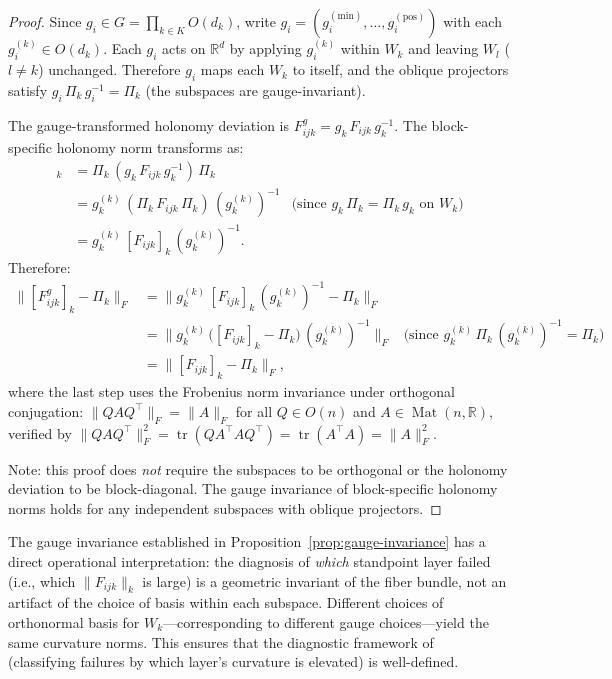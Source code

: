 \begin{proof}
Since $g_i \in G = \prod_{k \in K} O(d_k)$, write $g_i = (g_i^{(\mathrm{min})}, \ldots,
g_i^{(\mathrm{pos})})$ with each $g_i^{(k)} \in O(d_k)$. Each $g_i$ acts on $\mathbb{R}^d$
by applying $g_i^{(k)}$ within $W_k$ and leaving $W_l$ ($l \neq k$) unchanged. Therefore
$g_i$ maps each $W_k$ to itself, and the oblique projectors satisfy $g_i\, \Pi_k\,
g_i^{-1} = \Pi_k$ (the subspaces are gauge-invariant).

The gauge-transformed holonomy deviation is $F^g_{ijk} = g_k\, F_{ijk}\, g_k^{-1}$. The
block-specific holonomy norm transforms as:
\begin{align*}
    [F^g_{ijk}]_k
    &= \Pi_k\, (g_k\, F_{ijk}\, g_k^{-1})\, \Pi_k \\
    &= g_k^{(k)}\, (\Pi_k\, F_{ijk}\, \Pi_k)\, (g_k^{(k)})^{-1}
       & \text{(since } g_k\, \Pi_k = \Pi_k\, g_k \text{ on } W_k\text{)} \\
    &= g_k^{(k)}\, [F_{ijk}]_k\, (g_k^{(k)})^{-1}.
\end{align*}
Therefore:
\begin{align*}
    \big\|[F^g_{ijk}]_k - \Pi_k\big\|_F
    &= \big\|g_k^{(k)}\, [F_{ijk}]_k\, (g_k^{(k)})^{-1} - \Pi_k\big\|_F \\
    &= \big\|g_k^{(k)}\, \big([F_{ijk}]_k - \Pi_k\big)\, (g_k^{(k)})^{-1}\big\|_F
       & \text{(since } g_k^{(k)}\, \Pi_k\, (g_k^{(k)})^{-1} = \Pi_k\text{)} \\
    &= \big\|[F_{ijk}]_k - \Pi_k\big\|_F,
\end{align*}
where the last step uses the Frobenius norm invariance under orthogonal conjugation:
$\|Q A Q^\top\|_F = \|A\|_F$ for all $Q \in O(n)$ and $A \in \operatorname{Mat}(n,
\mathbb{R})$, verified by $\|Q A Q^\top\|_F^2 = \operatorname{tr}(Q A^\top A Q^\top) =
\operatorname{tr}(A^\top A) = \|A\|_F^2$.

Note: this proof does \emph{not} require the subspaces to be orthogonal or the holonomy deviation
to be block-diagonal. The gauge invariance of block-specific holonomy norms holds for
any independent subspaces with oblique projectors.
\end{proof}

\begin{remark}
The gauge invariance established in Proposition~\ref{prop:gauge-invariance} has a direct
operational interpretation: the diagnosis of \emph{which} standpoint layer failed (i.e.,
which $\|F_{ijk}\|_k$ is large) is a geometric invariant of the fiber bundle, not an
artifact of the choice of basis within each subspace. Different choices of orthonormal
basis for $W_k$---corresponding to different gauge choices---yield the same curvature
norms. This ensures that the diagnostic framework of~\cite{LCESA} (classifying failures
by which layer's curvature is elevated) is well-defined.
\end{remark}

